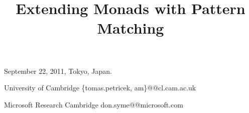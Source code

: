 \documentclass{sigplanconf}
\begin{document}

\newcommand{\ident}[1]{{\normalfont\sffamily #1}}
\newcommand{\code}[1]{{\normalfont\ttfamily #1}}
\newcommand{\mzip}[0]{\otimes}
\newcommand{\morelse}[0]{\oplus}
\newcommand{\mzero}[0]{\Varid{mzero}}
\newcommand{\munit}[0]{\Varid{unit}}
\newcommand{\map}[0]{\Varid{map}}
\newcommand{\malias}[0]{\Varid{malias}}
\newcommand{\mcojoin}[0]{\Varid{cojoin}}
\newcommand{\mplus}[0]{\oplus}
\newcommand{\fsharp}[0]{F$^\#$}
\newcommand{\todo}[1]{\textcolor{red}{[TODO] #1}}

 {September 22, 2011, Tokyo, Japan.}


\title{Extending Monads with Pattern Matching}

           {University of Cambridge}
           {\{tomas.petricek, am\}@@cl.cam.ac.uk}

           {Microsoft Research Cambridge}
           {don.syme@@microsoft.com}

\maketitle
\end{document}
